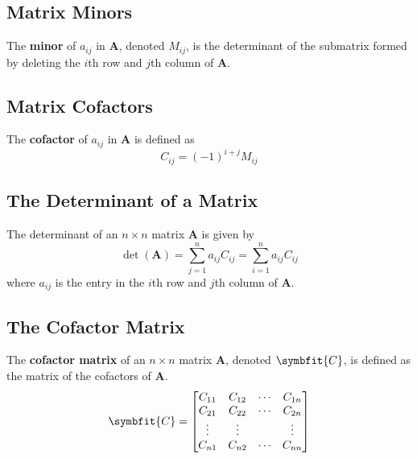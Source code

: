 \documentclass{article}
\begin{document}
\subsection{Matrix Minors}
\begin{definition}
    The \textbf{minor} of \(a_{ij}\) in \(\symbf{A}\), denoted
    \(M_{ij}\), is the determinant of the submatrix formed by deleting
    the \(i\)th row and \(j\)th column of \(\symbf{A}\).
\end{definition}
\subsection{Matrix Cofactors}
\begin{definition}
    The \textbf{cofactor} of \(a_{ij}\) in \(\symbf{A}\) is defined as
    \begin{equation*}
        C_{ij} = \left( -1 \right)^{i+j} M_{ij}
    \end{equation*}
\end{definition}
\subsection{The Determinant of a Matrix}
\begin{theorem}
    The determinant of an \(n\times n\) matrix \(\symbf{A}\) is given
    by
    \begin{equation*}
        \det{\left( \symbf{A} \right)} = \sum_{j=1}^n a_{ij}C_{ij} = \sum_{i=1}^n a_{ij}C_{ij}
    \end{equation*}
    where \(a_{ij}\) is the entry in the \(i\)th row and \(j\)th column
    of \(\symbf{A}\).
\end{theorem}
\subsection{The Cofactor Matrix}
\begin{definition}
    The \textbf{cofactor matrix} of an \(n\times n\) matrix
    \(\symbf{A}\), denoted \(\symbfit{C}\), is defined as the matrix
    of the cofactors of \(\symbf{A}\).
    \begin{equation*}
        \symbfit{C} =
        \begin{bmatrix}
            C_{11} & C_{12} & \cdots & C_{1n} \\
            C_{21} & C_{22} & \cdots & C_{2n} \\
            \vdots & \vdots &        & \vdots \\
            C_{n1} & C_{n2} & \cdots & C_{nn}
        \end{bmatrix}
    \end{equation*}
\end{definition}
\end{document}
